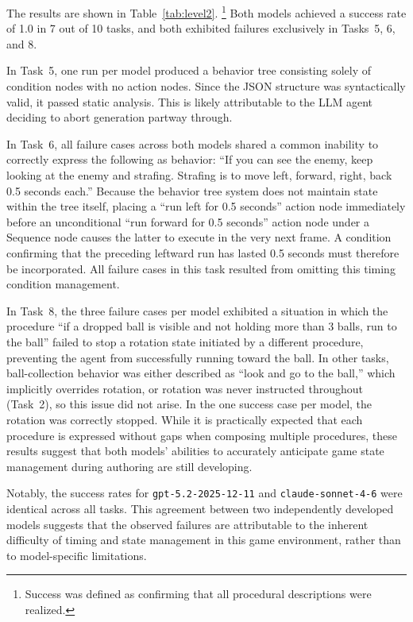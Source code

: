 \documentclass[conference]{IEEEtran}
\begin{document}
The results are shown in Table~\ref{tab:level2}.%
\footnote{Success was defined as confirming that all procedural descriptions were realized.}
Both models achieved a success rate of 1.0 in 7 out of 10 tasks, and both exhibited failures exclusively in Tasks~5, 6, and 8.

In Task~5, one run per model produced a behavior tree consisting solely of condition nodes with no action nodes. Since the JSON structure was syntactically valid, it passed static analysis. This is likely attributable to the LLM agent deciding to abort generation partway through.

In Task~6, all failure cases across both models shared a common inability to correctly express the following as behavior: ``If you can see the enemy, keep looking at the enemy and strafing. Strafing is to move left, forward, right, back 0.5 seconds each.'' Because the behavior tree system does not maintain state within the tree itself, placing a ``run left for 0.5 seconds'' action node immediately before an unconditional ``run forward for 0.5 seconds'' action node under a Sequence node causes the latter to execute in the very next frame. A condition confirming that the preceding leftward run has lasted 0.5 seconds must therefore be incorporated. All failure cases in this task resulted from omitting this timing condition management.

In Task~8, the three failure cases per model exhibited a situation in which the procedure ``if a dropped ball is visible and not holding more than 3 balls, run to the ball'' failed to stop a rotation state initiated by a different procedure, preventing the agent from successfully running toward the ball. In other tasks, ball-collection behavior was either described as ``look and go to the ball,'' which implicitly overrides rotation, or rotation was never instructed throughout (Task~2), so this issue did not arise. In the one success case per model, the rotation was correctly stopped. While it is practically expected that each procedure is expressed without gaps when composing multiple procedures, these results suggest that both models' abilities to accurately anticipate game state management during authoring are still developing.

Notably, the success rates for \texttt{gpt-5.2-2025-12-11} and \texttt{claude-sonnet-4-6} were identical across all tasks. This agreement between two independently developed models suggests that the observed failures are attributable to the inherent difficulty of timing and state management in this game environment, rather than to model-specific limitations.
\end{document}
